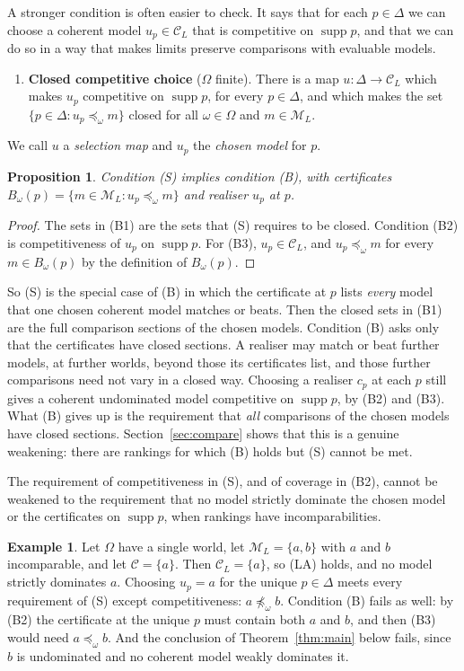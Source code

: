\documentclass[11pt]{article}
\newtheorem{proposition}[theorem]{Proposition}
\theoremstyle{definition}
\newtheorem{example}[theorem]{Example}
\theoremstyle{remark}
\newcommand{\M}{\mathcal M}
\newcommand{\C}{\mathcal C}
\newcommand{\supp}{\operatorname{supp}}
\begin{document}
A stronger condition is often easier to check. It says that for each $p\in\Delta$ we can choose a coherent model $u_p\in\C_L$ that is competitive on $\supp p$, and that we can do so in a way that makes limits preserve comparisons with evaluable models.
\begin{enumerate}[label=\textbf{(S)},leftmargin=*]
\item \textbf{Closed competitive choice} ($\Omega$ finite). There is a map $u:\Delta\to\C_L$ which makes $u_p$ competitive on $\supp p$, for every $p\in\Delta$, and which makes the set $\{p\in\Delta:u_p\preceq_\omega m\}$ closed for all $\omega\in\Omega$ and $m\in\M_L$.
\end{enumerate}
We call $u$ a \emph{selection map} and $u_p$ the \emph{chosen model} for $p$.

\begin{proposition}\label{prop:SB}
Condition (S) implies condition (B), with certificates $B_\omega(p)=\{m\in\M_L:u_p\preceq_\omega m\}$ and realiser $u_p$ at $p$.
\end{proposition}
\begin{proof}
The sets in (B1) are the sets that (S) requires to be closed. Condition (B2) is competitiveness of $u_p$ on $\supp p$. For (B3), $u_p\in\C_L$, and $u_p\preceq_\omega m$ for every $m\in B_\omega(p)$ by the definition of $B_\omega(p)$.
\end{proof}
So (S) is the special case of (B) in which the certificate at $p$ lists \emph{every} model that one chosen coherent model matches or beats. Then the closed sets in (B1) are the full comparison sections of the chosen models. Condition (B) asks only that the certificates have closed sections. A realiser may match or beat further models, at further worlds, beyond those its certificates list, and those further comparisons need not vary in a closed way. Choosing a realiser $c_p$ at each $p$ still gives a coherent undominated model competitive on $\supp p$, by (B2) and (B3). What (B) gives up is the requirement that \emph{all} comparisons of the chosen models have closed sections. Section~\ref{sec:compare} shows that this is a genuine weakening: there are rankings for which (B) holds but (S) cannot be met.

The requirement of competitiveness in (S), and of coverage in (B2), cannot be weakened to the requirement that no model strictly dominate the chosen model or the certificates on $\supp p$, when rankings have incomparabilities.
\begin{example}\label{ex:incomparable}
Let $\Omega$ have a single world, let $\M_L=\{a,b\}$ with $a$ and $b$ incomparable, and let $\C=\{a\}$. Then $\C_L=\{a\}$, so (LA) holds, and no model strictly dominates $a$. Choosing $u_p=a$ for the unique $p\in\Delta$ meets every requirement of (S) except competitiveness: $a\not\preceq_\omega b$. Condition (B) fails as well: by (B2) the certificate at the unique $p$ must contain both $a$ and $b$, and then (B3) would need $a\preceq_\omega b$. And the conclusion of Theorem~\ref{thm:main} below fails, since $b$ is undominated and no coherent model weakly dominates it.
\end{example}
\end{document}

